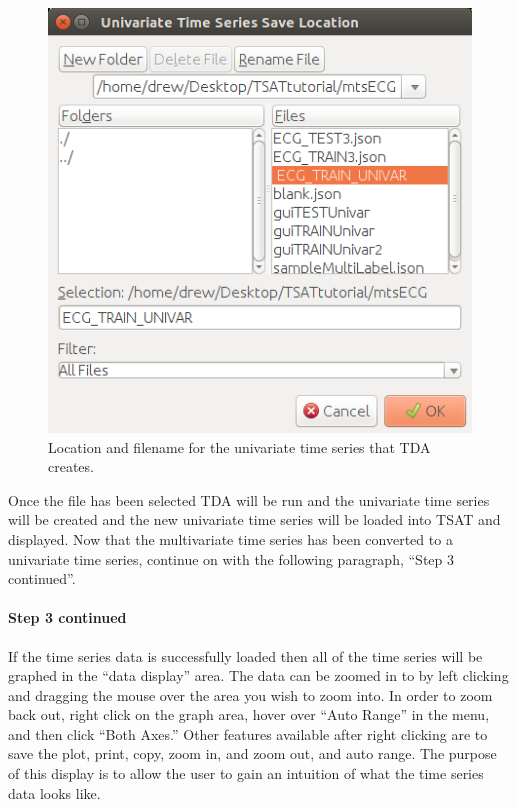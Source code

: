 \documentclass[titlepage, letterpaper, 12pt]{article}
\begin{document}
\begin{figure}
	\centering
	\includegraphics[width=\textwidth]{pictures/univarTSSaveLoc}
	\caption{Location and filename for the univariate time series that TDA creates.}
	\label{fig:univartssaveloc}
\end{figure}


Once the file has been selected TDA will be run and the univariate time series will be created and the new univariate time series will be loaded into TSAT and displayed.  Now that the multivariate time series has been converted to a univariate time series, continue on with the following paragraph, ``Step 3 continued''.

\paragraph{Step 3 continued}
If the time series data is successfully loaded then all of the time series will be graphed in the ``data display'' area.  The data can be zoomed in to by left clicking and dragging the mouse over the area you wish to zoom into.  In order to zoom back out, right click on the graph area, hover over ``Auto Range'' in the menu, and then click ``Both Axes.''  Other features available after right clicking are to save the plot, print, copy, zoom in, and zoom out, and auto range.  The purpose of this display is to allow the user to gain an intuition of what the time series data looks like.
\end{document}
